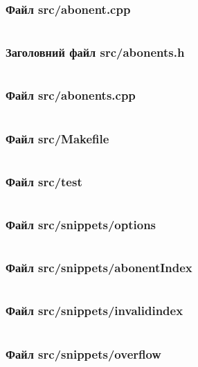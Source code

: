\documentclass[a4paper, 12pt, oneside]{extarticle}
\begin{document}
\subsubsection*{Файл src/abonent.cpp}
\inputminted{c++}{abonents/src/abonent.cpp}

\subsubsection*{Заголовний файл src/abonents.h}
\inputminted{c++}{abonents/include/abonents.h}

\subsubsection*{Файл src/abonents.cpp}
\inputminted{c++}{abonents/src/abonents.cpp}

\subsubsection*{Файл src/Makefile}
\inputminted{make}{abonents/src/Makefile}

\subsubsection*{Файл src/test}
\inputminted{c++}{abonents/src/test}

\subsubsection*{Файл src/snippets/options}
\inputminted{c++}{abonents/src/snippets/options}

\subsubsection*{Файл src/snippets/abonentIndex}
\inputminted{c++}{abonents/src/snippets/abonentIndex}

\subsubsection*{Файл src/snippets/invalidindex}
\inputminted{c++}{abonents/src/snippets/invalidindex}

\subsubsection*{Файл src/snippets/overflow}
\inputminted{c++}{abonents/src/snippets/overflow}
\end{document}

